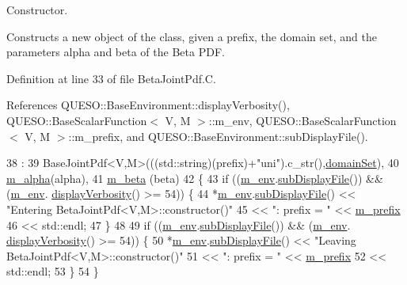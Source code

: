 Constructor. 

Constructs a new object of the class, given a prefix, the domain set, and the parameters {\ttfamily alpha} and {\ttfamily beta} of the Beta P\-D\-F. 

Definition at line 33 of file Beta\-Joint\-Pdf.\-C.



References Q\-U\-E\-S\-O\-::\-Base\-Environment\-::display\-Verbosity(), Q\-U\-E\-S\-O\-::\-Base\-Scalar\-Function$<$ V, M $>$\-::m\-\_\-env, Q\-U\-E\-S\-O\-::\-Base\-Scalar\-Function$<$ V, M $>$\-::m\-\_\-prefix, and Q\-U\-E\-S\-O\-::\-Base\-Environment\-::sub\-Display\-File().


\begin{DoxyCode}
38   :
39   BaseJointPdf<V,M>(((std::string)(prefix)+\textcolor{stringliteral}{"uni"}).c\_str(),\hyperlink{class_q_u_e_s_o_1_1_base_scalar_function_ad0937628825249dd36ded3ce0c7959ac}{domainSet}),
40   \hyperlink{class_q_u_e_s_o_1_1_beta_joint_pdf_aaed2224330514a2b04d0b2924b7f9f49}{m\_alpha}(alpha),
41   \hyperlink{class_q_u_e_s_o_1_1_beta_joint_pdf_a71e4c9d34bc0732044efd7b30dea2841}{m\_beta} (beta)
42 \{
43   \textcolor{keywordflow}{if} ((\hyperlink{class_q_u_e_s_o_1_1_base_scalar_function_adf44141aeb765d97613286f88f235f04}{m\_env}.\hyperlink{class_q_u_e_s_o_1_1_base_environment_a8a0064746ae8dddfece4229b9ad374d6}{subDisplayFile}()) && (\hyperlink{class_q_u_e_s_o_1_1_base_scalar_function_adf44141aeb765d97613286f88f235f04}{m\_env}.
      \hyperlink{class_q_u_e_s_o_1_1_base_environment_a1fe5f244fc0316a0ab3e37463f108b96}{displayVerbosity}() >= 54)) \{
44     *\hyperlink{class_q_u_e_s_o_1_1_base_scalar_function_adf44141aeb765d97613286f88f235f04}{m\_env}.\hyperlink{class_q_u_e_s_o_1_1_base_environment_a8a0064746ae8dddfece4229b9ad374d6}{subDisplayFile}() << \textcolor{stringliteral}{"Entering BetaJointPdf<V,M>::constructor()"}
45                             << \textcolor{stringliteral}{": prefix = "} << \hyperlink{class_q_u_e_s_o_1_1_base_scalar_function_a6e81dc902aca6a546877da99b2f4a169}{m\_prefix}
46                             << std::endl;
47   \}
48 
49   \textcolor{keywordflow}{if} ((\hyperlink{class_q_u_e_s_o_1_1_base_scalar_function_adf44141aeb765d97613286f88f235f04}{m\_env}.\hyperlink{class_q_u_e_s_o_1_1_base_environment_a8a0064746ae8dddfece4229b9ad374d6}{subDisplayFile}()) && (\hyperlink{class_q_u_e_s_o_1_1_base_scalar_function_adf44141aeb765d97613286f88f235f04}{m\_env}.
      \hyperlink{class_q_u_e_s_o_1_1_base_environment_a1fe5f244fc0316a0ab3e37463f108b96}{displayVerbosity}() >= 54)) \{
50     *\hyperlink{class_q_u_e_s_o_1_1_base_scalar_function_adf44141aeb765d97613286f88f235f04}{m\_env}.\hyperlink{class_q_u_e_s_o_1_1_base_environment_a8a0064746ae8dddfece4229b9ad374d6}{subDisplayFile}() << \textcolor{stringliteral}{"Leaving BetaJointPdf<V,M>::constructor()"}
51                             << \textcolor{stringliteral}{": prefix = "} << \hyperlink{class_q_u_e_s_o_1_1_base_scalar_function_a6e81dc902aca6a546877da99b2f4a169}{m\_prefix}
52                             << std::endl;
53   \}
54 \}
\end{DoxyCode}
